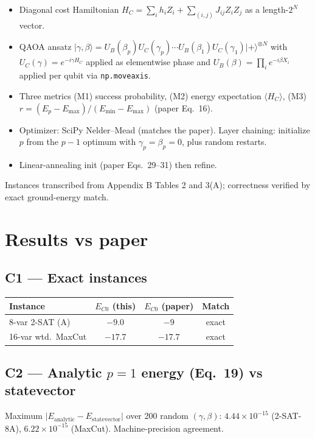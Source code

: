 \documentclass[11pt]{article}
\begin{document}
\begin{itemize}
  \item Diagonal cost Hamiltonian $H_C = \sum_i h_i Z_i + \sum_{(i,j)} J_{ij} Z_i Z_j$
        as a length-$2^N$ vector.
  \item QAOA ansatz $\lvert\gamma,\beta\rangle = U_B(\beta_p) U_C(\gamma_p)\cdots
        U_B(\beta_1)U_C(\gamma_1) \lvert +\rangle^{\otimes N}$
        with $U_C(\gamma)=e^{-i\gamma H_C}$ applied as elementwise phase and
        $U_B(\beta)=\prod_i e^{-i\beta X_i}$ applied per qubit via
        \texttt{np.moveaxis}.
  \item Three metrics (M1) success probability, (M2) energy expectation
        $\langle H_C\rangle$, (M3) $r=(E_p - E_{\max})/(E_{\min}-E_{\max})$
        (paper Eq.~16).
  \item Optimizer: SciPy Nelder--Mead (matches the paper). Layer chaining:
        initialize $p$ from the $p{-}1$ optimum with $\gamma_p{=}\beta_p{=}0$,
        plus random restarts.
  \item Linear-annealing init (paper Eqs.~29--31) then refine.
\end{itemize}

Instances transcribed from Appendix B Tables 2 and 3(A); correctness verified
by exact ground-energy match.

\section{Results vs paper}
\subsection*{C1 --- Exact instances}
\begin{tabular}{lccc}
\toprule
Instance & $E_{C0}$ (this) & $E_{C0}$ (paper) & Match \\
\midrule
8-var 2-SAT (A) & $-9.0$ & $-9$ & exact \\
16-var wtd.\ MaxCut & $-17.7$ & $-17.7$ & exact \\
\bottomrule
\end{tabular}

\subsection*{C2 --- Analytic $p{=}1$ energy (Eq.~19) vs statevector}
Maximum $\lvert E_{\text{analytic}} - E_{\text{statevector}}\rvert$ over 200 random
$(\gamma,\beta)$: $4.44\times10^{-15}$ (2-SAT-8A), $6.22\times10^{-15}$ (MaxCut).
Machine-precision agreement.
\end{document}
